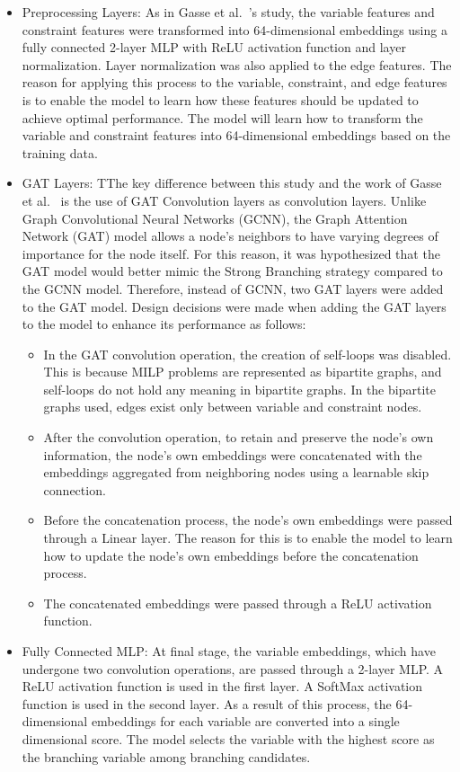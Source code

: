\begin{itemize}
  \item Preprocessing Layers: As in Gasse et al.~\cite{gasseExactCombinatorialOptimization2019}'s study, the variable features and constraint features were transformed into 64-dimensional embeddings using a fully connected 2-layer MLP with ReLU activation function and layer normalization.
  Layer normalization was also applied to the edge features.
  The reason for applying this process to the variable, constraint, and edge features is to enable the model to learn how these features should be updated to achieve optimal performance.
  The model will learn how to transform the variable and constraint features into 64-dimensional embeddings based on the training data.
  \item GAT Layers: TThe key difference between this study and the work of Gasse et al.~\cite{gasseExactCombinatorialOptimization2019} is the use of GAT Convolution layers as convolution layers.
  Unlike Graph Convolutional Neural Networks (GCNN), the Graph Attention Network (GAT) model allows a node's neighbors to have varying degrees of importance for the node itself.
  For this reason, it was hypothesized that the GAT model would better mimic the Strong Branching strategy compared to the GCNN model.
  Therefore, instead of GCNN, two GAT layers were added to the GAT model.
  Design decisions were made when adding the GAT layers to the model to enhance its performance as follows:
  \begin{itemize}
      \item In the GAT convolution operation, the creation of self-loops was disabled.
      This is because MILP problems are represented as bipartite graphs, and self-loops do not hold any meaning in bipartite graphs.
      In the bipartite graphs used, edges exist only between variable and constraint nodes.
      \item After the convolution operation, to retain and preserve the node's own information, the node's own embeddings were concatenated with the embeddings aggregated from neighboring nodes using a learnable skip connection.
      \item Before the concatenation process, the node's own embeddings were passed through a Linear layer.
      The reason for this is to enable the model to learn how to update the node's own embeddings before the concatenation process.
      \item The concatenated embeddings were passed through a ReLU activation function.
  \end{itemize}
  \item Fully Connected MLP: At final stage, the variable embeddings, which have undergone two convolution operations, are passed through a 2-layer MLP.
  A ReLU activation function is used in the first layer.
  A SoftMax activation function is used in the second layer.
  As a result of this process, the 64-dimensional embeddings for each variable are converted into a single dimensional score.
  The model selects the variable with the highest score as the branching variable among branching candidates.
\end{itemize}


